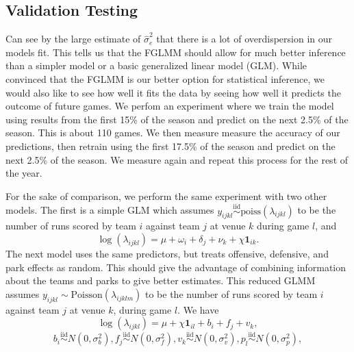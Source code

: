 \documentclass [52pt] {article}
\newcommand{\simiid}{\overset{\text{iid}}{\sim}}
\begin{document}
\subsection{Validation Testing}

Can see by the large estimate of $\hat{\sigma}^2_e$ that there is a lot of overdispersion in our models fit.  This tells us that the FGLMM should allow for much better inference than a simpler model or a basic generalized linear model (GLM).  While convinced that the FGLMM is our better option for statistical inference, we would also like to see how well it fits the data by seeing how well it predicts the outcome of future games.  We perfom an experiment where we train the model using results from the first 15\% of the season and predict on the next 2.5\% of the season.  This is about 110 games.  We then measure measure the accuracy of our predictions, then retrain using the first 17.5\% of the season and predict on the next 2.5\% of the season.  We measure again and repeat this process for the rest of the year.

For the sake of comparison, we perform the same experiment with two other models.  The first is a simple GLM which assumes $y_{ijkl}\simiid\text{poiss}(\lambda_{ijkl})$ to be the number of runs scored by team $i$ against team $j$ at venue $k$ during game $l$, and 
\begin{equation}\label{eq : glm}
\log(\lambda_{ijkl}) = \mu + \omega_i + \delta_j + \nu_k + \chi\mathbf{1}_{ik}.
\end{equation}
The next model uses the same predictors, but treats offensive, defensive, and park effects as random.  This should give the advantage of combining information about the teams and parks to give better estimates.  This reduced GLMM assumes $y_{ijkl}\sim\text{Poisson}(\lambda_{ijklm})$ to be the number of runs scored by team $i$ against team $j$ at venue $k$, during game $l$.  We have
\begin{equation}\label{eq : glme_red}
\log(\lambda_{ijkl}) = \mu + \chi \mathbf{1}_{il} + b_i + f_j + v_k,
\end{equation}
\[b_i\simiid N(0,\sigma^2_b), f_j\simiid N(0,\sigma^2_f), v_k\simiid N(0,\sigma^2_v), p_l\simiid N(0, \sigma^2_p),\]
\end{document}
